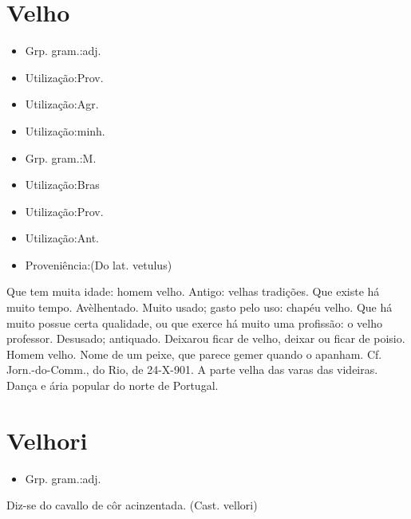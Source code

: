 \documentclass{article}
\begin{document}
\section{Velho}
\begin{itemize}
\item {Grp. gram.:adj.}
\end{itemize}
\begin{itemize}
\item {Utilização:Prov.}
\end{itemize}
\begin{itemize}
\item {Utilização:Agr.}
\end{itemize}
\begin{itemize}
\item {Utilização:minh.}
\end{itemize}
\begin{itemize}
\item {Grp. gram.:M.}
\end{itemize}
\begin{itemize}
\item {Utilização:Bras}
\end{itemize}
\begin{itemize}
\item {Utilização:Prov.}
\end{itemize}
\begin{itemize}
\item {Utilização:Ant.}
\end{itemize}
\begin{itemize}
\item {Proveniência:(Do lat. \textunderscore vetulus\textunderscore )}
\end{itemize}
Que tem muita idade: \textunderscore homem velho\textunderscore .
Antigo: \textunderscore velhas tradições\textunderscore .
Que existe há muito tempo.
Avèlhentado.
Muito usado; gasto pelo uso: \textunderscore chapéu velho\textunderscore .
Que há muito possue certa qualidade, ou que exerce há muito uma profissão: \textunderscore o velho professor\textunderscore .
Desusado; antiquado.
\textunderscore Deixar\textunderscore  ou \textunderscore ficar de velho\textunderscore , deixar ou ficar de poisio.
Homem velho.
Nome de um peixe, que parece gemer quando o apanham. Cf. \textunderscore Jorn.-do-Comm.\textunderscore , do Rio, de 24-X-901.
A parte velha das varas das videiras.
Dança e ária popular do norte de Portugal.
\section{Velhori}
\begin{itemize}
\item {Grp. gram.:adj.}
\end{itemize}
Diz-se do cavallo de côr acinzentada.
(Cast. \textunderscore vellori\textunderscore )
\end{document}
